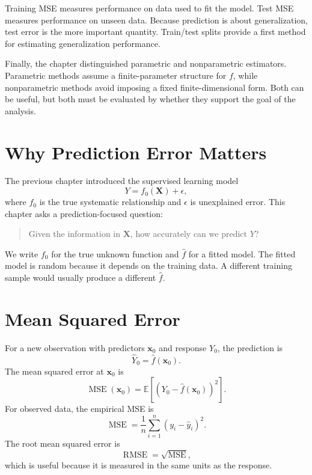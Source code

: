 {Training MSE measures performance on data used to fit the model.  Test MSE measures performance on unseen data.  Because prediction is about generalization, test error is the more important quantity.  Train/test splits provide a first method for estimating generalization performance.

Finally, the chapter distinguished parametric and nonparametric estimators.  Parametric methods assume a finite-parameter structure for $f$, while nonparametric methods avoid imposing a fixed finite-dimensional form.  Both can be useful, but both must be evaluated by whether they support the goal of the analysis.
}{
\section{Why Prediction Error Matters}

The previous chapter introduced the supervised learning model
\begin{equation}
  Y=f_0(\mathbf{X})+\epsilon,
  \label{eq:ch2-true-model}
\end{equation}
where $f_0$ is the true systematic relationship and $\epsilon$ is unexplained error.  This chapter asks a prediction-focused question:
\begin{quote}
  Given the information in $\mathbf{X}$, how accurately can we predict $Y$?
\end{quote}
We write $f_0$ for the true unknown function and $\hat f$ for a fitted model.  The fitted model is random because it depends on the training data.  A different training sample would usually produce a different $\hat f$.

\section{Mean Squared Error}

For a new observation with predictors $\mathbf{x}_0$ and response $Y_0$, the prediction is
\[
  \widehat{Y}_0=\hat f(\mathbf{x}_0).
\]
The mean squared error at $\mathbf{x}_0$ is
\begin{equation}
  \operatorname{MSE}(\mathbf{x}_0)
  =\mathbb{E}\left[\left(Y_0-\hat f(\mathbf{x}_0)\right)^2\right].
  \label{eq:ch2-mse-fixed-x}
\end{equation}
For observed data, the empirical MSE is
\begin{equation}
  \operatorname{MSE}
  =\frac{1}{n}\sum_{i=1}^n (y_i-\hat y_i)^2.
  \label{eq:ch2-empirical-mse}
\end{equation}
The root mean squared error is
\begin{equation}
  \operatorname{RMSE}=\sqrt{\operatorname{MSE}},
  \label{eq:ch2-rmse}
\end{equation}
which is useful because it is measured in the same units as the response.

}
